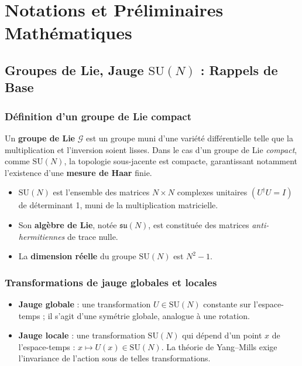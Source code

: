 \chapter{Notations et Préliminaires Mathématiques}
\label{chap:3}

\section{Groupes de Lie, Jauge \texorpdfstring{\(\mathrm{SU}(N)\)}{SU(N)} : Rappels de Base}
\label{sec:3.1}

\subsection*{Définition d’un groupe de Lie compact}
Un \textbf{groupe de Lie} \(\mathcal{G}\) est un groupe muni d’une variété différentielle telle que la multiplication et l’inversion soient lisses. Dans le cas d’un groupe de Lie \emph{compact}, comme \(\mathrm{SU}(N)\), la topologie sous-jacente est compacte, garantissant notamment l’existence d’une \textbf{mesure de Haar} finie.  
\begin{itemize}
	\item \(\mathrm{SU}(N)\) est l’ensemble des matrices \(N\times N\) complexes unitaires \((U^\dagger U = I)\) de déterminant 1, muni de la multiplication matricielle.
	\item Son \textbf{algèbre de Lie}, notée \(\mathfrak{su}(N)\), est constituée des matrices \emph{anti-hermitiennes} de trace nulle.
	\item La \textbf{dimension réelle} du groupe \(\mathrm{SU}(N)\) est \(N^2 - 1\).
\end{itemize}

\subsection*{Transformations de jauge globales et locales}
\begin{itemize}
	\item \textbf{Jauge globale} : une transformation \(U \in \mathrm{SU}(N)\) constante sur l’espace-temps ; il s’agit d’une symétrie globale, analogue à une rotation.
	\item \textbf{Jauge locale} : une transformation \(\mathrm{SU}(N)\) qui dépend d’un point \(x\) de l’espace-temps : \(x \mapsto U(x)\in \mathrm{SU}(N)\). La théorie de Yang--Mills exige l’invariance de l’action sous de telles transformations.
\end{itemize}

